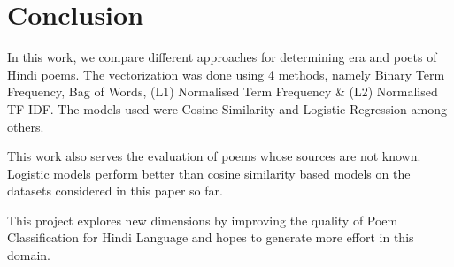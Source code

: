 \documentclass[11pt,a4paper]{article}
\begin{document}
\section{Conclusion}
In this work, we compare different approaches for determining era and poets of Hindi poems. The vectorization was done using 4 methods, namely Binary Term Frequency, Bag of Words, (L1) Normalised Term Frequency \& (L2) Normalised TF-IDF. The models used were Cosine Similarity and Logistic Regression among others. 

This work also serves the evaluation of poems whose sources are not known. Logistic models perform better than cosine similarity based models on the datasets considered  in  this  paper so far. 

This project explores new dimensions by improving the quality of Poem Classification for Hindi Language and hopes to generate more effort in this domain. 

\vspace{6cm}
\nocite{c1}
\nocite{c2}
\nocite{c3}


\end{document}
